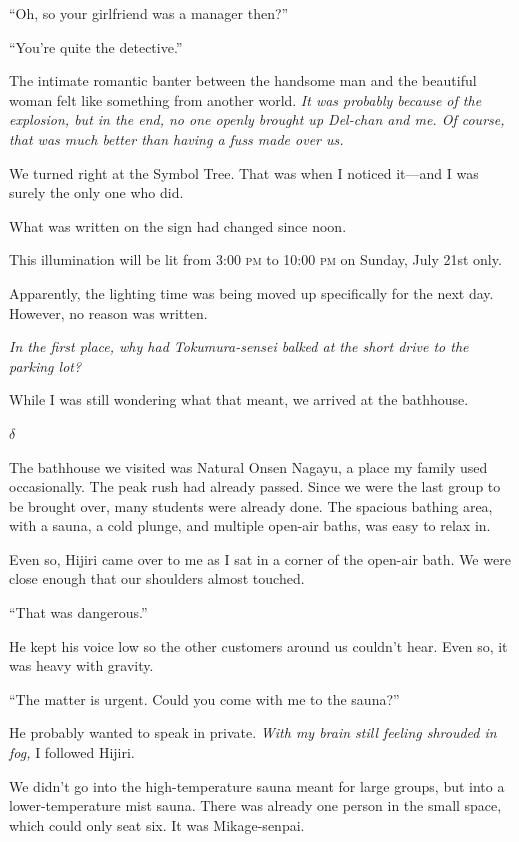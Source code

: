 \documentclass[
    a4paper,
    12pt,
    twoside,
    openany,
    UTF8,
    fontset=windows
]{ctexbook}
\begin{document}
``Oh, so your girlfriend was a manager then?''

``You're quite the detective.''

The intimate romantic banter between the handsome man and the beautiful woman felt like something from another world. \textit{It was probably because of the explosion, but in the end, no one openly brought up Del-chan and me. Of course, that was much better than having a fuss made over us.}

We turned right at the Symbol Tree. That was when I noticed it---and I was surely the only one who did.

What was written on the sign had changed since noon.

\begin{center}
This illumination will be lit from 3:00 \textsc{pm} to 10:00 \textsc{pm} on Sunday, July 21st only.
\end{center}

Apparently, the lighting time was being moved up specifically for the next day. However, no reason was written.

\textit{In the first place, why had Tokumura-sensei balked at the short drive to the parking lot?}

While I was still wondering what that meant, we arrived at the bathhouse.

$\delta$

The bathhouse we visited was Natural Onsen Nagayu, a place my family used occasionally. The peak rush had already passed. Since we were the last group to be brought over, many students were already done. The spacious bathing area, with a sauna, a cold plunge, and multiple open-air baths, was easy to relax in.

Even so, Hijiri came over to me as I sat in a corner of the open-air bath. We were close enough that our shoulders almost touched.

``That was dangerous.''

He kept his voice low so the other customers around us couldn't hear. Even so, it was heavy with gravity.

``The matter is urgent. Could you come with me to the sauna?''

He probably wanted to speak in private. \textit{With my brain still feeling shrouded in fog,} I followed Hijiri.

We didn't go into the high-temperature sauna meant for large groups, but into a lower-temperature mist sauna. There was already one person in the small space, which could only seat six. It was Mikage-senpai.
\end{document}
